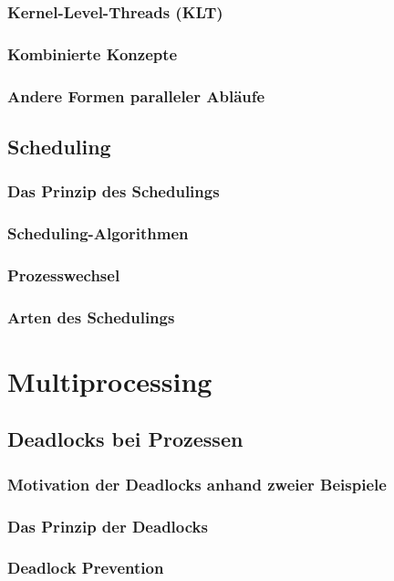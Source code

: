 \documentclass{article}
\begin{document}
\subsubsection{Kernel-Level-Threads (KLT)}
\subsubsection{Kombinierte Konzepte}
\subsubsection{Andere Formen paralleler Abläufe}
\subsection{Scheduling}
\subsubsection{Das Prinzip des Schedulings}
\subsubsection{Scheduling-Algorithmen}
\subsubsection{Prozesswechsel}
\subsubsection{Arten des Schedulings}

\newpage
\section{Multiprocessing}
\subsection{Deadlocks bei Prozessen}
\subsubsection{Motivation der Deadlocks anhand zweier Beispiele}
\subsubsection{Das Prinzip der Deadlocks}
\subsubsection{Deadlock Prevention}
\end{document}
